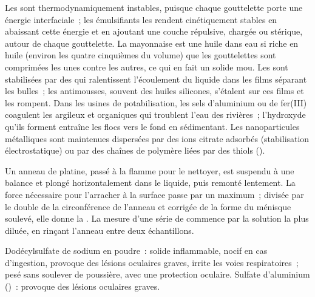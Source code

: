 Les  sont thermodynamiquement instables, puisque chaque
gouttelette porte une énergie interfaciale~; les émulsifiants les
rendent cinétiquement stables en abaissant cette énergie et en ajoutant
une couche répulsive, chargée ou stérique, autour de chaque gouttelette.
La mayonnaise est une  huile dans eau si riche en huile (environ
les quatre cinquièmes du volume) que les gouttelettes sont comprimées
les unes contre les autres, ce qui en fait un solide mou. Les 
sont stabilisées par des  qui ralentissent l'écoulement du
liquide dans les films séparant les bulles~; les antimousses, souvent des
huiles silicones, s'étalent sur ces films et les rompent. Dans les usines
de potabilisation, les sels d'aluminium ou de fer(III) coagulent les
 argileux et organiques qui troublent l'eau des rivières~;
l'hydroxyde qu'ils forment entraîne les flocs vers le fond en
sédimentant. Les nanoparticules métalliques sont maintenues dispersées
par des ions citrate adsorbés (stabilisation électrostatique) ou par des
chaînes de polymère liées par des thiols ().

\begin{inthelab}
Un anneau de platine, passé à la flamme pour le nettoyer, est suspendu à
une balance et plongé horizontalement dans le liquide, puis remonté
lentement. La force nécessaire pour l'arracher à la surface passe par un
maximum~; divisée par le double de la circonférence de l'anneau et
corrigée de la forme du ménisque soulevé, elle donne la . La mesure d'une série de  commence par la
solution la plus diluée, en rinçant l'anneau entre deux échantillons.
\end{inthelab}

\begin{safety}{}
Dodécylsulfate de sodium en poudre~: solide inflammable, nocif en cas
d'ingestion, provoque des lésions oculaires graves, irrite les voies
respiratoires~; pesé sans soulever de poussière, avec une protection
oculaire. Sulfate d'aluminium ()~: provoque des lésions
oculaires graves.
\end{safety}

